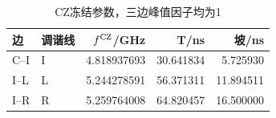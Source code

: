 \begin{table}[htbp]\centering\small
\caption{CZ冻结参数，三边峰值因子均为1}\label{tab:czparams}
\begin{tabular}{@{}llrrr@{}}\toprule
边 & 调谐线 & $f^{\mathrm{CZ}}$/GHz & T/ns & 坡/ns\\\midrule
C--I & I & 4.818937693 & 30.641834 & 5.725930\\
I--L & L & 5.244278591 & 56.371311 & 11.894511\\
I--R & R & 5.259764008 & 64.820457 & 16.500000\\
\bottomrule\end{tabular}\end{table}
